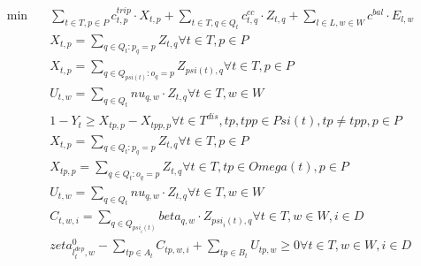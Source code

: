 \begin{align}
  \min\quad & \sum_{t \in T, p \in P} c_{t , p}^{t r i p} \cdot X_{t , p} + \sum_{t \in T, q \in Q_{t}} c_{t , q}^{c c} \cdot Z_{t , q} + \sum_{l \in L, w \in W} c^{b a l} \cdot E_{l , w} \tag{eq\_0001} \\
  & X_{t , p} = \sum_{q \in Q_{t} : p_{q} = p} Z_{t , q} \forall t \in T , p \in P \tag{eq\_0005} \\
  & X_{t , p} = \sum_{q \in Q_{\mathit{psi} \left(t\right)} : o_{q} = p} Z_{\mathit{psi} \left(t\right) , q} \forall t \in T , p \in P \tag{eq\_0006} \\
  & U_{t , w} = \sum_{q \in Q_{t}} \mathit{nu}_{q , w} \cdot Z_{t , q} \forall t \in T , w \in W \tag{eq\_0007} \\
  & 1 - Y_{t} \geq X_{tp , p} - X_{tpp , p} \forall t \in T^{d i s} , tp , tpp \in \mathit{Psi} \left(t\right) , tp \neq tpp , p \in P \tag{eq\_0011} \\
  & X_{t , p} = \sum_{q \in Q_{t} : p_{q} = p} Z_{t , q} \forall t \in T , p \in P \tag{eq\_0022} \\
  & X_{tp , p} = \sum_{q \in Q_{t} : o_{q} = p} Z_{t , q} \forall t \in T , tp \in \mathit{Omega} \left(t\right) , p \in P \tag{eq\_0023} \\
  & U_{t , w} = \sum_{q \in Q_{t}} \mathit{nu}_{q , w} \cdot Z_{t , q} \forall t \in T , w \in W \tag{eq\_0024} \\
  & C_{t , w , i} = \underset{q \in Q_{\mathit{psi}_{i} \left(t\right)}}{\sum} \mathit{beta}_{q , w} \cdot Z_{\mathit{psi}_{i} \left(t\right) , q} \forall t \in T , w \in W , i \in D \tag{eq\_0025} \\
  & \mathit{zeta}_{l_{t}^{d e p} , w}^{0} - \sum_{tp \in A_{t}} C_{tp , w , i} + \sum_{tp \in B_{t}} U_{tp , w} \geq 0 \forall t \in T , w \in W , i \in D \tag{eq\_0026} \\
\end{align}
